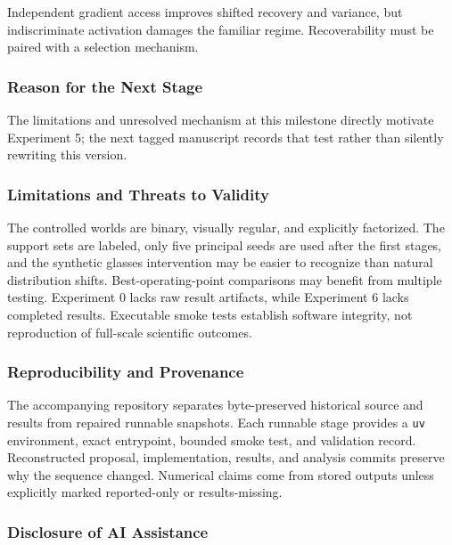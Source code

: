 \documentclass[
  10pt,
]{article}
\begin{document}
Independent gradient access improves shifted recovery and variance, but
indiscriminate activation damages the familiar regime. Recoverability
must be paired with a selection mechanism.

\hypertarget{reason-for-the-next-stage}{%
\subsubsection{Reason for the Next
Stage}\label{reason-for-the-next-stage}}

The limitations and unresolved mechanism at this milestone directly
motivate Experiment 5; the next tagged manuscript records that test
rather than silently rewriting this version.

\hypertarget{limitations-and-threats-to-validity}{%
\subsubsection{Limitations and Threats to
Validity}\label{limitations-and-threats-to-validity}}

The controlled worlds are binary, visually regular, and explicitly
factorized. The support sets are labeled, only five principal seeds are
used after the first stages, and the synthetic glasses intervention may
be easier to recognize than natural distribution shifts.
Best-operating-point comparisons may benefit from multiple testing.
Experiment 0 lacks raw result artifacts, while Experiment 6 lacks
completed results. Executable smoke tests establish software integrity,
not reproduction of full-scale scientific outcomes.

\hypertarget{reproducibility-and-provenance}{%
\subsubsection{Reproducibility and
Provenance}\label{reproducibility-and-provenance}}

The accompanying repository separates byte-preserved historical source
and results from repaired runnable snapshots. Each runnable stage
provides a \texttt{uv} environment, exact entrypoint, bounded smoke
test, and validation record. Reconstructed proposal, implementation,
results, and analysis commits preserve why the sequence changed.
Numerical claims come from stored outputs unless explicitly marked
reported-only or results-missing.

\hypertarget{disclosure-of-ai-assistance}{%
\subsubsection{Disclosure of AI
Assistance}\label{disclosure-of-ai-assistance}}
\end{document}
